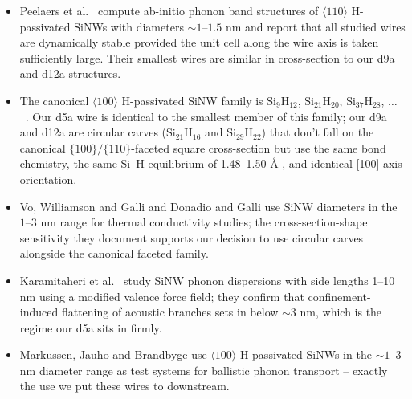 \begin{itemize}
  \item Peelaers et al.\ \cite{Peelaers2009sinw} compute ab-initio
        phonon band structures of $\langle 110 \rangle$ H-passivated
        SiNWs with diameters $\sim 1$--$1.5$ nm and report that all
        studied wires are dynamically stable provided the unit cell
        along the wire axis is taken sufficiently large.  Their
        smallest wires are similar in cross-section to our d9a and
        d12a structures.
  \item The canonical $\langle 100 \rangle$ H-passivated SiNW
        family is Si$_9$H$_{12}$, Si$_{21}$H$_{20}$, Si$_{37}$H$_{28}$, $\ldots$~\cite{Rurali2010colloquium}.
        Our d5a wire is identical to the smallest member of this
        family; our d9a and d12a are circular carves (Si$_{21}$H$_{16}$
        and Si$_{29}$H$_{22}$) that don't fall on the canonical
        $\{100\}/\{110\}$-faceted square cross-section but use the same
        bond chemistry, the same Si--H equilibrium of 1.48--1.50 Å
        \cite{Vo2008atomistic}, and identical [100] axis orientation.
  \item Vo, Williamson and Galli \cite{Vo2008atomistic} and Donadio and
        Galli \cite{Donadio2010thermal} use SiNW diameters in the
        $1$--$3$ nm range for thermal conductivity studies; the
        cross-section-shape sensitivity they document supports our
        decision to use circular carves alongside the canonical
        faceted family.
  \item Karamitaheri et al.\ \cite{Karamitaheri2013mvff} study SiNW
        phonon dispersions with side lengths 1--10 nm using a modified
        valence force field; they confirm that confinement-induced
        flattening of acoustic branches sets in below $\sim 3$ nm,
        which is the regime our d5a sits in firmly.
  \item Markussen, Jauho and Brandbyge \cite{Markussen2007anisotropic}
        use $\langle 100 \rangle$ H-passivated SiNWs in the
        $\sim 1$--$3$ nm diameter range as test systems for ballistic
        phonon transport -- exactly the use we put these wires to
        downstream.
\end{itemize}

